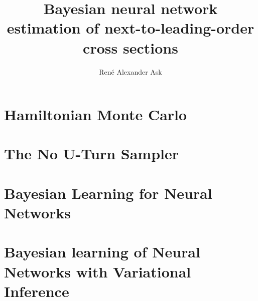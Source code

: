 \documentclass[UKenglish]{book}
\title{Bayesian neural network estimation of next-to-leading-order cross sections}
\author{René Alexander Ask}
\begin{document}
\duoforside[dept={Department of Physics},
  program={Master's Program Name},
  long]

\frontmatter{}


\tableofcontents{}

\mainmatter{}

	



\chapter{Hamiltonian Monte Carlo}\label{chap:hmc}

\chapter{The No U-Turn Sampler}\label{chap:no_u_turn_sampler}


\chapter{Bayesian Learning for Neural Networks}\label{chap:bnn}



\chapter{Bayesian learning of Neural Networks with Variational Inference}


%
%
%
%
%
\end{document}
